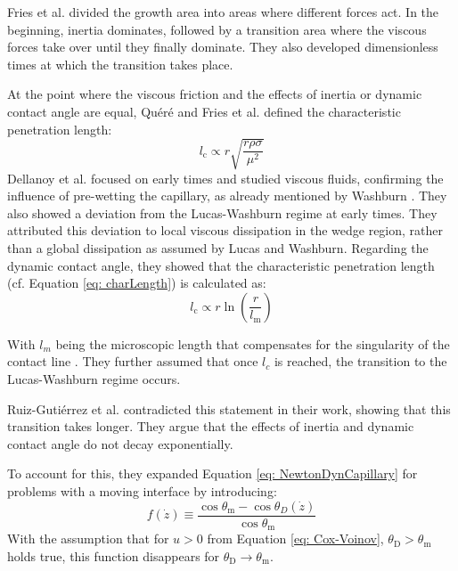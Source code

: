 Fries et al. \cite{fries2008TransitionInertialViscous} divided the growth area into areas where different forces act. In the beginning, inertia dominates, followed by a transition area where the viscous forces take over until they finally dominate. They also developed dimensionless times at which the transition takes place.

At the point where the viscous friction and the effects of inertia or dynamic contact angle are equal, Quéré \cite{quere1997InertialCapillarity} and Fries et al. \cite{fries2008TransitionInertialViscous} defined the characteristic penetration length:
\begin{equation}
    \label{eq: charLength}
    l_{\mathrm{c}} \propto r \sqrt{\frac{r\rho \sigma}{\mu^2}}
\end{equation}
Dellanoy et al. \cite{delannoy2019DualRoleViscosity} focused on early times and studied viscous fluids, confirming the influence of pre-wetting the capillary, as already mentioned by Washburn \cite{washburn1921DynamicsCapillaryFlow}. They also showed a deviation from the Lucas-Washburn regime at early times. They attributed this deviation to local viscous dissipation in the wedge region, rather than a global dissipation as assumed by Lucas and Washburn. Regarding the dynamic contact angle, they showed that the characteristic penetration length (cf. Equation \ref{eq: charLength}) is calculated as:
\begin{equation}
    l_{\mathrm{c}} \propto r \ln\left(\frac{r}{l_{\mathrm{m}}}\right)
\end{equation}

With $l_m$ being the microscopic length that compensates for the singularity of the contact line \cite{cox1986DynamicsSpreadingLiquids}. They further assumed that once $l_c$ is reached, the transition to the Lucas-Washburn regime occurs.

Ruiz-Gutiérrez et al. \cite{ruiz-gutierrez2022LongCrossoverDynamics} contradicted this statement in their work, showing that this transition takes longer. They argue that the effects of inertia and dynamic contact angle do not decay exponentially. 

To account for this, they expanded Equation \ref{eq: NewtonDynCapillary} for problems with a moving interface by introducing:
\begin{equation}
    f(\dot{z}) \equiv \frac{\cos\theta_{\mathrm{m}}-\cos\theta_D(\dot{z})}{\cos\theta_{\mathrm{m}}} 
\end{equation}
With the assumption that for $u>0$ from Equation \ref{eq: Cox-Voinov}, $\theta_{\mathrm{D}} > \theta_{\mathrm{m}}$ holds true, this function disappears for $\theta_{\mathrm{D}} \rightarrow \theta_{\mathrm{m}}$. 

